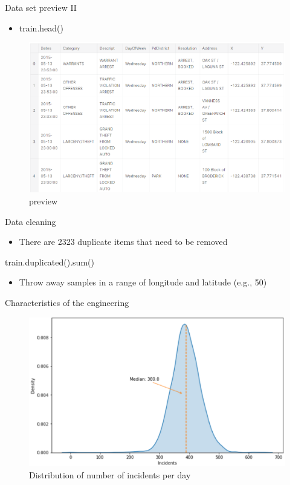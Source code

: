 \documentclass[
 size=14pt,
 paper=smartboard,  %
 mode=present, 		%
 display=slides, 	%
 style=tuliplab,  	%
 pauseslide,
 fleqn,leqno]{powerdot}
\begin{document}
\begin{slide}[toc=,bm=]{Data set preview II}
	\begin{itemize}
	\item train.head()
	\end{itemize}
	\begin{center}
		\begin{figure}[htbp]
			\includegraphics[scale=0.6]{./pic/qmyangben.eps}
			\caption{preview}
		\end{figure}
	\end{center}
\end{slide}

\begin{slide}{Data cleaning}
	\begin{itemize}
		\item There are 2323 duplicate items that need to be removed
	\end{itemize}
		train.duplicated().sum()
	\begin{itemize}
		\item Throw away samples in a range of longitude and latitude (e.g., 50)
	\end{itemize}
	
	
\end{slide}

\begin{slide}{Characteristics of the engineering}
	\begin{center}
		\begin{figure}[htbp]
			\includegraphics[scale=0.8]{./pic/qmzhengtai.eps}
			\caption{Distribution of number of incidents per day}
		\end{figure}
	\end{center}
	
\end{slide}
\end{document}
